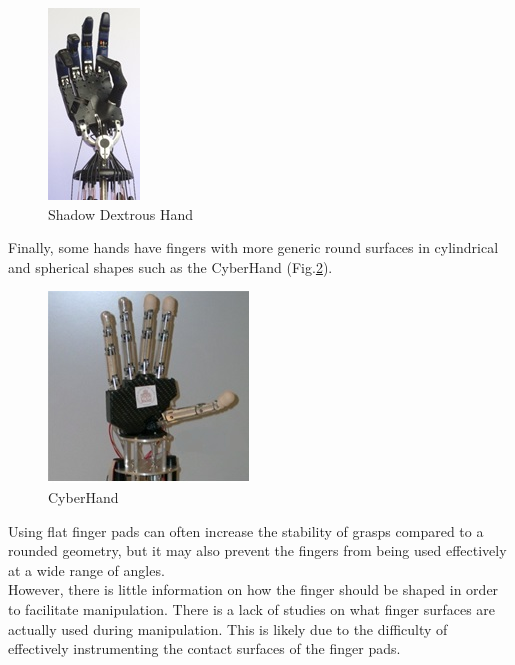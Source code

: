 \documentclass[a4paper, 10pt, conference]{ieeeconf}      %
\begin{document}
\begin{figure}[h!]
\centering  \includegraphics[scale=0.7]{./images/ShadowDextrousHand}
  \caption{Shadow Dextrous Hand}
  \label{fig:ShadowDextrousHand}
	\end{figure}
Finally, some hands have fingers with more generic round surfaces in cylindrical and spherical shapes such as the CyberHand (Fig.\ref{fig:CyberHand}).\\
\begin{figure}[h!]
\centering  \includegraphics[scale=0.7]{./images/CyberHand}
  \caption{CyberHand}
  \label{fig:CyberHand}
	\end{figure}
Using flat finger pads can often increase the stability of grasps compared to a rounded geometry, but it may also prevent the fingers from being used effectively at a wide range of angles.\\
However, there is little information on how the finger should be shaped in order to facilitate manipulation. There is a lack of studies on what finger surfaces are actually used during manipulation. This is likely due to the difficulty of effectively instrumenting the contact surfaces of the finger pads.\\
\end{document}
